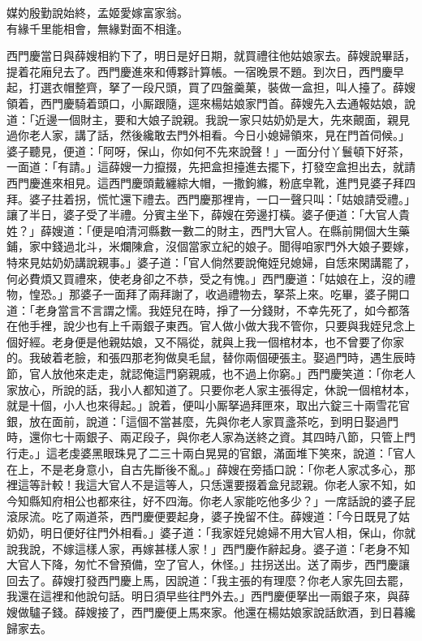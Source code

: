\begin{myquote} 
媒妁殷勤說始終，孟姬愛嫁富家翁。\\有緣千里能相會，無緣對面不相逢。
\end{myquote} 

西門慶當日與薛嫂相約下了，明日是好日期，就買禮往他姑娘家去。薛嫂說畢話，提着花廂兒去了。西門慶進來和傅夥計算帳。一宿晚景不題。到次日，西門慶早起，打選衣帽整齊，拏了一段尺頭，買了四盤羹菓，裝做一盒担，叫人擡了。薛嫂領着，西門慶騎着頭口，小厮跟隨，逕來楊姑娘家門首。薛嫂先入去通報姑娘，說道：「近邊一個財主，{}要和大娘子說親。我說一家只姑奶奶是大，先來覿面，親見過你老人家，講了話，{}然後纔敢去門外相看。今日小媳婦領來，見在門首伺候。」婆子聽見，便道：「阿呀，{}保山，你如何不先來說聲！」一面分付丫鬟頓下好茶，一面道：「有請。」這薛嫂一力攛掇，先把盒担擡進去擺下，打發空盒担出去，就請西門慶進來相見。這西門慶頭戴纏綜大帽，一撒鉤縧，粉底皁靴，進門見婆子拜四拜。婆子拄着拐，慌忙還下禮去。西門慶那裡肯，一口一聲只叫：「姑娘請受禮。」讓了半日，婆子受了半禮。分賓主坐下，薛嫂在旁邊打橫。婆子便道：「大官人貴姓？」薛嫂道：「便是咱清河縣數一數二的財主，西門大官人。在縣前開個大生藥鋪，家中錢過北斗，米爛陳倉，沒個當家立紀的娘子。聞得咱家門外大娘子要嫁，特來見姑奶奶講說親事。」婆子道：「官人倘然要說俺姪兒媳婦，自恁來閑講罷了，何必費煩又買禮來，使老身卻之不恭，受之有愧。」西門慶道：「姑娘在上，沒的禮物，惶恐。」那婆子一面拜了兩拜謝了，收過禮物去，拏茶上來。吃畢，婆子開口道：「老身當言不言謂之懦。{}我姪兒在時，掙了一分錢財，不幸先死了，如今都落在他手裡，說少也有上千兩銀子東西。官人做小做大我不管你，只要與我姪兒念上個好經。老身便是他親姑娘，又不隔從，就與上我一個棺材本，也不曾要了你家的。我破着老臉，和張四那老狗做臭毛鼠，替你兩個硬張主。娶過門時，遇生辰時節，官人放他來走走，就認俺這門窮親戚，也不過上你窮。」{}西門慶笑道：「你老人家放心，所說的話，我小人都知道了。只要你老人家主張得定，休說一個棺材本，就是十個，小人也來得起。」說着，便叫小厮拏過拜匣來，取出六錠三十兩雪花官銀，放在面前，說道：「這個不當甚麼，先與你老人家買盞茶吃，到明日娶過門時，還你七十兩銀子、兩疋段子，與你老人家為送終之資。其四時八節，只管上門行走。」這老虔婆黑眼珠見了二三十兩白晃晃的官銀，滿面堆下笑來，說道：「官人在上，不是老身意小，自古先斷後不亂。」薛嫂在旁插口說：「你老人家忒多心，那裡這等計較！我這大官人不是這等人，只恁還要掇着盒兒認親。你老人家不知，如今知縣知府相公也都來往，好不四海。你老人家能吃他多少？」一席話說的婆子屁滾尿流。吃了兩道茶，西門慶便要起身，婆子挽留不住。薛嫂道：「今日既見了姑奶奶，明日便好往門外相看。」婆子道：「我家姪兒媳婦不用大官人相，保山，你就說我說，不嫁這樣人家，再嫁甚樣人家！」西門慶作辭起身。婆子道：「老身不知大官人下降，匆忙不曾預備，空了官人，休怪。」拄拐送出。送了兩步，西門慶讓回去了。薛嫂打發西門慶上馬，因說道：「我主張的有理麼？你老人家先回去罷，我還在這裡和他說句話。明日須早些往門外去。」西門慶便拏出一兩銀子來，與薛嫂做驢子錢。薛嫂接了，西門慶便上馬來家。他還在楊姑娘家說話飲酒，到日暮纔歸家去。

